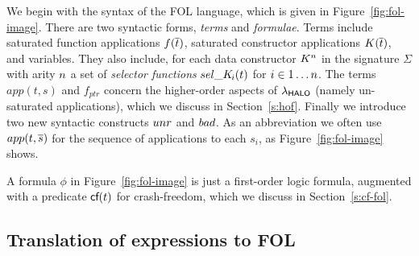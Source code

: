 We begin with the syntax of the FOL language, which is given in
Figure~\ref{fig:fol-image}. There are two syntactic forms,
\emph{terms} and \emph{formulae}. Terms include saturated function applications
$f(\overline{t})$, saturated constructor applications $K(\overline{t})$, and variables. They
also include, for each data constructor $K^n$ in the signature
$\Sigma$ with arity $n$ a set of {\em selector functions}
$\mathop{sel\_K\!_{i}}(t)$ for $i \in 1 \ldots n$.  The terms $app(t,s)$ and
$f_{ptr}$ concern the higher-order aspects of $\lambda_{\sf HALO}$
(namely un-saturated applications), which we
discuss in Section~\ref{s:hof}.  Finally we introduce two new
syntactic constructs $\mathop{unr}$ and $\mathop{bad}$. As an abbreviation we often use
$app(t,\overline{s})$ for the sequence of applications to each $s_i$, as
Figure~\ref{fig:fol-image} shows.

A formula $\phi$ in Figure~\ref{fig:fol-image} is just a first-order logic
formula, augmented with a predicate $\textsf{cf}(t)$ for crash-freedom, which
we discuss in Section~\ref{s:cf-fol}.

\subsection{Translation of expressions to FOL}\label{ssect:trans-exprs}

